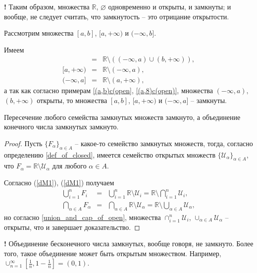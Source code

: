 \begin{mydanger}{\bf!}
Таким образом, множества $\mathbb{R}$, $\varnothing$ одновременно и открыты, и замкнуты; и вообще, не следует считать, что замкнутость -- это отрицание открытости.
\end{mydanger}

\begin{example}\label{[a,b]is_closed}
Рассмотрим множества $[a,b]$, $[a,+\infty)$ и $(-\infty, b]$.

Имеем
\begin{eqnarray*}
    [a,b] &=& \mathbb{R}\setminus ((-\infty, a) \cup (b, +\infty)),\\
    {[a,+\infty)} &=& \mathbb{R} \setminus (-\infty, a),\\
    {(-\infty, a]} &=& \mathbb{R} \setminus (a, +\infty),
\end{eqnarray*}
а так как согласно примерам \ref{(a,b)c(open}, \ref{(a,8)c(open)}, множества $(-\infty, a),$ $(b, +\infty)$ открыты, то множества $[a,b]$, $[a,+\infty)$ и $(-\infty, a]$ -- замкнуты.
\end{example}

\begin{lemma}
    Пересечение любого семейства замкнутых множеств замкнуто, а объединение конечного числа замкнутых замкнуто.
\end{lemma}

\begin{proof}
Пусть $\{F_\alpha\}_{\alpha \in A}$ -- какое-то семейство замкнутых множеств, тогда, согласно определению \ref{def_of_closed}, имеется семейство открытых множеств $\{\mathscr{U}_\alpha\}_{\alpha \in A}$, что $F_\alpha = \mathbb{R}\setminus \mathscr{U}_\alpha$ для любого $\alpha \in A.$

Согласно (\ref{dM1}), (\ref{dM1}) получаем
\begin{eqnarray*}
 \bigcup_{i=1}^n F_i &=& \bigcup_{i=1}^n \mathbb{R} \setminus \mathscr{U}_i =  \mathbb{R} \setminus \bigcap_{i=1}^n\mathscr{U}_i, \\
 \bigcap_{\alpha \in A} F_\alpha &=& \bigcap_{\alpha \in A} \mathbb{R} \setminus \mathscr{U}_\alpha = \mathbb{R} \setminus \bigcup_{\alpha \in A} \mathscr{U}_\alpha,   
\end{eqnarray*}
но согласно \ref{union_and_cap_of_open}, множества $\cap_{i=1}^n\mathscr{U}_i$, $\cup_{\alpha \in A} \mathscr{U}_\alpha$ -- открыты, что и завершает доказательство.
\end{proof}

\begin{mydanger}{\bf !}
    Объединение бесконечного числа замкнутых, вообще говоря, не замкнуто. Более того, такое объединение может быть открытым множеством. Например, $\cup_{n=1}^\infty \left[\frac{1}{n},1-\frac{1}{n} \right] = (0,1).$
\end{mydanger}

